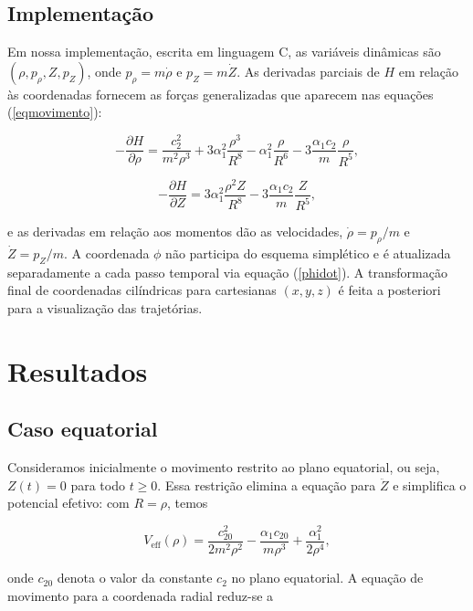 \documentclass[twocolumn]{rbef}
\begin{document}
\subsection{Implementação}

Em nossa implementação, escrita em linguagem C, as variáveis dinâmicas são $(\rho, p_\rho, Z, p_Z)$, onde $p_\rho = m\dot{\rho}$ e $p_Z = m\dot{Z}$. As derivadas parciais de $H$ em relação às coordenadas fornecem as forças generalizadas que aparecem nas equações (\ref{eqmovimento}):

\begin{equation}
-\dfrac{\partial H}{\partial \rho} = \dfrac{c_2^2}{m^2\rho^3} + 3\alpha_1^2\dfrac{\rho^3}{R^8} - \alpha_1^2\dfrac{\rho}{R^6} - 3\dfrac{\alpha_1 c_2}{m}\dfrac{\rho}{R^5},
\end{equation}

\begin{equation}
-\dfrac{\partial H}{\partial Z} = 3\alpha_1^2\dfrac{\rho^2 Z}{R^8} - 3\dfrac{\alpha_1 c_2}{m}\dfrac{Z}{R^5},
\end{equation}

\noindent e as derivadas em relação aos momentos dão as velocidades, $\dot{\rho} = p_\rho / m$ e $\dot{Z} = p_Z / m$. A coordenada $\phi$ não participa do esquema simplético e é atualizada separadamente a cada passo temporal via equação (\ref{phidot}). A transformação final de coordenadas cilíndricas para cartesianas $(x, y, z)$ é feita a posteriori para a visualização das trajetórias.

\section{Resultados}

\subsection{Caso equatorial}

Consideramos inicialmente o movimento restrito ao plano equatorial, ou seja, $Z(t) = 0$ para todo $t \geq 0$. Essa restrição elimina a equação para $\ddot{Z}$ e simplifica o potencial efetivo: com $R = \rho$, temos

\begin{equation}\label{veffEquatorial}
    V_{\text{eff}}(\rho) = \dfrac{c_{20}^2}{2m^2\rho^2} - \dfrac{\alpha_1 c_{20}}{m\rho^3} + \dfrac{\alpha_1^2}{2\rho^4},
\end{equation}

\noindent onde $c_{20}$ denota o valor da constante $c_2$ no plano equatorial. A equação de movimento para a coordenada radial reduz-se a
\end{document}
